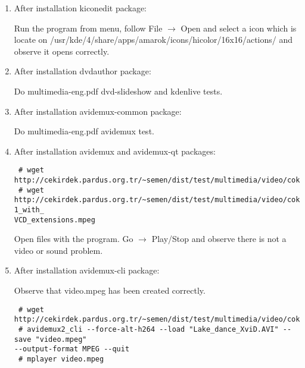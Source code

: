 \documentclass[a4paper,10pt]{article}
\begin{document}
\begin{enumerate}
\item After installation kiconedit package:

Run the program from menu, follow File $\rightarrow$ Open and select a icon which is locate on /usr/kde/4/share/apps/amarok/icons/hicolor/16x16/actions/ and observe it opens correctly.

\item After installation dvdauthor package:

Do multimedia-eng.pdf dvd-slideshow and kdenlive tests.

 \item After installation avidemux-common package:

 Do multimedia-eng.pdf avidemux test.

 \item After installation avidemux and avidemux-qt packages:

\begin{verbatim}
 # wget http://cekirdek.pardus.org.tr/~semen/dist/test/multimedia/video/cokluortam/Lake_dance_XviD.AVI
 # wget http://cekirdek.pardus.org.tr/~semen/dist/test/multimedia/video/cokluortam/MPEG-1_with_
VCD_extensions.mpeg
\end{verbatim}
Open files with the program. Go $\rightarrow$ Play/Stop and observe there is not a video or sound problem.
\item After installation avidemux-cli package:

Observe that video.mpeg has been created correctly.
\begin{verbatim}
 # wget http://cekirdek.pardus.org.tr/~semen/dist/test/multimedia/video/cokluortam/Lake_dance_XviD.AVI
 # avidemux2_cli --force-alt-h264 --load "Lake_dance_XviD.AVI" --save "video.mpeg" 
--output-format MPEG --quit 
 # mplayer video.mpeg
\end{verbatim}

\end{enumerate}
\end{document}
